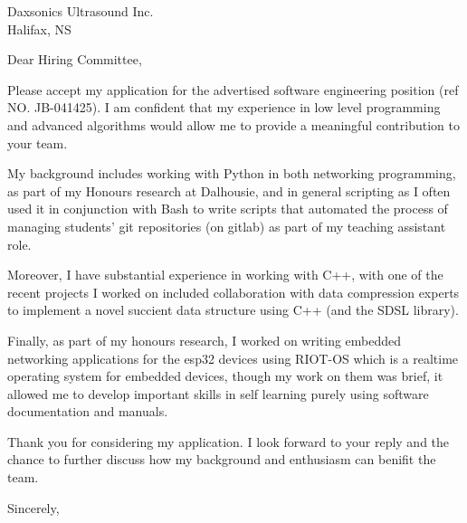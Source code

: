 \documentclass{letter}
\begin{document}
\longindentation=0pt


\begin{letter}{Daxsonics Ultrasound Inc. \\ Halifax, NS}
\opening{Dear Hiring Committee,}

Please accept my application for the advertised software engineering position (ref NO. JB-041425). I am confident
that my experience in low level programming and advanced algorithms would allow me to provide a meaningful contribution to
your team.

My background includes working with Python in both networking programming, as part of my Honours research at Dalhousie, and 
in general scripting as I often used it in conjunction with Bash to write scripts that automated the process of managing 
students' git repositories (on gitlab) as part of my teaching assistant role.

Moreover, I have substantial experience in working with C++, with one of the recent projects I worked on included
collaboration with data compression experts to implement a novel succient data structure using C++ (and the SDSL library).

Finally, as part of my honours research, I worked on writing embedded networking applications for the esp32 devices using 
RIOT-OS which is a realtime operating system for embedded devices, though my work on them was brief, it allowed me to develop important skills
in self learning purely using software documentation and manuals.

Thank you for considering my application. I look forward to your reply and the chance to further discuss how my
background and enthusiasm can benifit the team. 


\closing{Sincerely,}
\end{letter}
\end{document}
